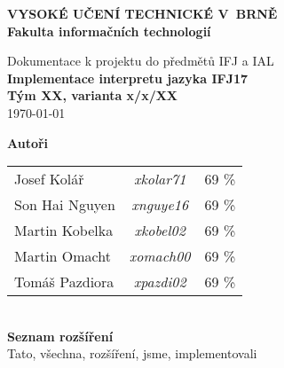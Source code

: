 \begin{titlepage}
    \centering

    {\fontsize{20pt}{15pt}\bfseries
    VYSOKÉ UČENÍ TECHNICKÉ V~BRNĚ\\
    \vspace{8pt}
    Fakulta informačních technologií
    }

    \vspace*{64pt}

    
    \vspace*{22pt}

    {\Large Dokumentace k projektu do předmětů IFJ a IAL\\}
    \vspace*{4pt}
    {\LARGE \bfseries Implementace interpretu jazyka IFJ17\\}
    \vspace*{62pt}
    {\Large \bfseries Tým XX, varianta x/x/XX\\}
    \vspace*{42pt}
    {\Large \today}

    \vspace*{64pt}
    {\Large \bfseries Autoři\\}
    \vspace*{8pt}
    \begin{tabular}{ l c r }
        Josef Kolář & \textit{xkolar71} & 69 \% \\
        Son Hai Nguyen & \textit{xnguye16} & 69 \% \\
        Martin Kobelka & \textit{xkobel02} & 69 \% \\
        Martin Omacht & \textit{xomach00} & 69 \% \\
        Tomáš Pazdiora & \textit{xpazdi02} & 69 \% \\
    \end{tabular}\\
    \vspace*{32pt}
    {\Large \bfseries Seznam rozšíření\\}
    \vspace*{8pt}
    Tato, všechna, rozšíření, jsme, implementovali\\
    \vspace*{64pt}

\end{titlepage}
